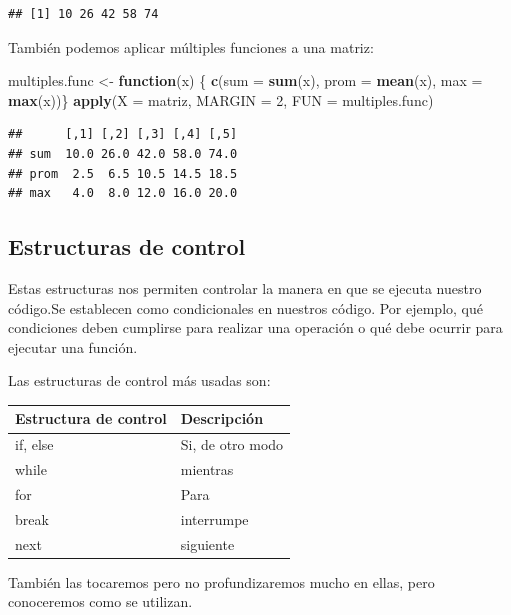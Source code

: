 \documentclass[
]{book}
\newenvironment{Shaded}{\begin{snugshade}}{\end{snugshade}}
\newcommand{\AttributeTok}[1]{\textcolor[rgb]{0.13,0.29,0.53}{#1}}
\newcommand{\ControlFlowTok}[1]{\textcolor[rgb]{0.13,0.29,0.53}{\textbf{#1}}}
\newcommand{\DecValTok}[1]{\textcolor[rgb]{0.00,0.00,0.81}{#1}}
\newcommand{\FunctionTok}[1]{\textcolor[rgb]{0.13,0.29,0.53}{\textbf{#1}}}
\newcommand{\NormalTok}[1]{#1}
\newcommand{\OtherTok}[1]{\textcolor[rgb]{0.56,0.35,0.01}{#1}}
\begin{document}
\begin{verbatim}
## [1] 10 26 42 58 74
\end{verbatim}

También podemos aplicar múltiples funciones a una matriz:

\begin{Shaded}
\begin{Highlighting}[]
\NormalTok{multiples.func }\OtherTok{\textless{}{-}} \ControlFlowTok{function}\NormalTok{(x) \{}
      \FunctionTok{c}\NormalTok{(}\AttributeTok{sum =} \FunctionTok{sum}\NormalTok{(x), }\AttributeTok{prom =} \FunctionTok{mean}\NormalTok{(x), }\AttributeTok{max =} \FunctionTok{max}\NormalTok{(x))\}}
\FunctionTok{apply}\NormalTok{(}\AttributeTok{X =}\NormalTok{ matriz, }\AttributeTok{MARGIN =} \DecValTok{2}\NormalTok{, }\AttributeTok{FUN =}\NormalTok{ multiples.func)}
\end{Highlighting}
\end{Shaded}

\begin{verbatim}
##      [,1] [,2] [,3] [,4] [,5]
## sum  10.0 26.0 42.0 58.0 74.0
## prom  2.5  6.5 10.5 14.5 18.5
## max   4.0  8.0 12.0 16.0 20.0
\end{verbatim}

\subsection{Estructuras de control}\label{estructuras-de-control}

Estas estructuras nos permiten controlar la manera en que se ejecuta nuestro código.Se establecen como condicionales en nuestros código.
Por ejemplo, qué condiciones deben cumplirse para realizar una operación o qué debe ocurrir para ejecutar una función.

Las estructuras de control más usadas son:

\begin{longtable}[]{@{}ll@{}}
\toprule\noalign{}
Estructura de control & Descripción \\
\midrule\noalign{}
\endhead
\bottomrule\noalign{}
\endlastfoot
if, else & Si, de otro modo \\
while & mientras \\
for & Para \\
break & interrumpe \\
next & siguiente \\
\end{longtable}

También las tocaremos pero no profundizaremos mucho en ellas, pero conoceremos como se utilizan.
\end{document}
